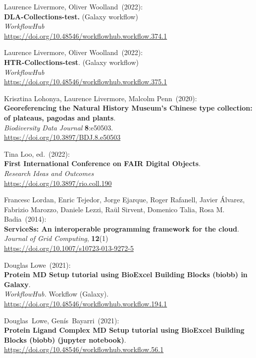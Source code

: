 \begin{thebibliography}{9}
Laurence Livermore, Oliver Woolland~(2022): \\
\textbf{DLA-Collections-test.} (Galaxy workflow)\\
\emph{WorkflowHub}\\
\url{https://doi.org/10.48546/workflowhub.workflow.374.1}

Laurence Livermore, Oliver Woolland~(2022): \\
\textbf{HTR-Collections-test}. (Galaxy workflow)\\
\emph{WorkflowHub}\\
\url{https://doi.org/10.48546/workflowhub.workflow.375.1}

Krisztina Lohonya, Laurence Livermore, Malcolm Penn~(2020): \\
\textbf{Georeferencing the Natural History Museum's Chinese type collection: of plateaus, pagodas and plants}.\\
\emph{Biodiversity Data Journal} \textbf{8}:e50503.\\
\url{https://doi.org/10.3897/BDJ.8.e50503}


Tina Loo, ed.~(2022): \\
\textbf{First International Conference on FAIR Digital Objects}.\\
\emph{Research Ideas and Outcomes}\\
\url{https://doi.org/10.3897/rio.coll.190}

Francesc Lordan, Enric Tejedor, Jorge Ejarque, Roger Rafanell, Javier Álvarez, Fabrizio Marozzo, Daniele Lezzi, Raül Sirvent, Domenico Talia, Rosa M. Badia~(2014): \\
\textbf{ServiceSs: An interoperable programming framework for the cloud}.\\
\emph{Journal of Grid Computing}, \textbf{12}(1)\\
\url{https://doi.org/10.1007/s10723-013-9272-5}

Douglas Lowe~(2021): \\
\textbf{Protein MD Setup tutorial using BioExcel Building Blocks (biobb) in Galaxy}.\\
\emph{WorkflowHub.} Workflow (Galaxy).\\
\url{https://doi.org/10.48546/workflowhub.workflow.194.1}

Douglas~Lowe, Genís~Bayarri~(2021): \\
\textbf{Protein Ligand Complex MD Setup tutorial using BioExcel Building Blocks (biobb) (jupyter notebook)}.\\
\url{https://doi.org/10.48546/workflowhub.workflow.56.1}


\end{thebibliography}
